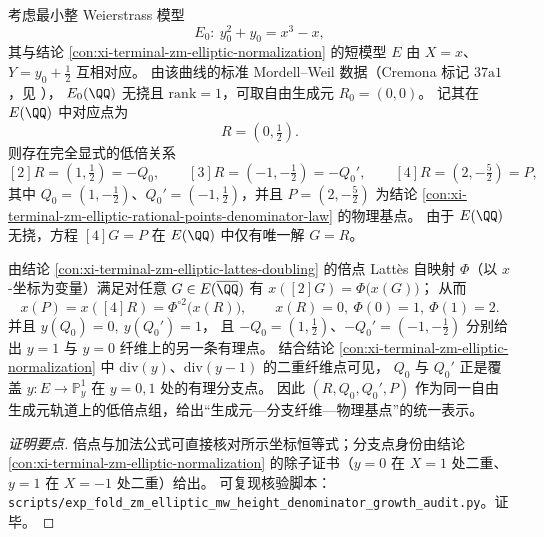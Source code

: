 
\begin{conclusion}\label{con:xi-terminal-zm-elliptic-mw-generator-alignment}
考虑最小整 Weierstrass 模型
\[
E_0:\ y_0^2+y_0=x^3-x,
\]
其与结论 \ref{con:xi-terminal-zm-elliptic-normalization} 的短模型 \(E\) 由 \(X=x\)、\(Y=y_0+\tfrac12\) 互相对应。
由该曲线的标准 Mordell--Weil 数据（Cremona 标记 \(37\mathrm{a}1\)，见 \cite{LMFDBEllipticCurve37a1}），
\(E_0(\QQ)\) 无挠且 \(\mathrm{rank}=1\)，可取自由生成元 \(R_0=(0,0)\)。
记其在 \(E(\QQ)\) 中对应点为
\[
R=(0,\tfrac12).
\]
则存在完全显式的低倍关系
\[
[2]R=\left(1,\tfrac12\right)=-Q_0,\qquad
[3]R=\left(-1,-\tfrac12\right)=-Q_0',\qquad
[4]R=\left(2,-\tfrac52\right)=P,
\]
其中 \(Q_0=(1,-\tfrac12)\)、\(Q_0'=(-1,\tfrac12)\)，并且 \(P=(2,-\tfrac52)\) 为结论 \ref{con:xi-terminal-zm-elliptic-rational-points-denominator-law} 的物理基点。
由于 \(E(\QQ)\) 无挠，方程 \([4]G=P\) 在 \(E(\QQ)\) 中仅有唯一解 \(G=R\)。
\par
由结论 \ref{con:xi-terminal-zm-elliptic-lattes-doubling} 的倍点 Latt\`es 自映射 \(\Phi\)（以 \(x\)-坐标为变量）满足对任意 \(G\in E(\overline{\QQ})\) 有
\(
x([2]G)=\Phi\bigl(x(G)\bigr)
\)；
从而
\[
x(P)=x([4]R)=\Phi^{\circ 2}\!\bigl(x(R)\bigr),
\qquad
x(R)=0,\ \Phi(0)=1,\ \Phi(1)=2.
\]
并且
\(
y(Q_0)=0,\ y(Q_0')=1
\)，
且 \(-Q_0=(1,\tfrac12)\)、\(-Q_0'=(-1,-\tfrac12)\) 分别给出 \(y=1\) 与 \(y=0\) 纤维上的另一条有理点。
结合结论 \ref{con:xi-terminal-zm-elliptic-normalization} 中 \(\mathrm{div}(y)\)、\(\mathrm{div}(y-1)\) 的二重纤维点可见，
\(Q_0\) 与 \(Q_0'\) 正是覆盖 \(y:E\to\mathbb P^1_y\) 在 \(y=0,1\) 处的有理分支点。
因此 \((R,Q_0,Q_0',P)\) 作为同一自由生成元轨道上的低倍点组，给出“生成元—分支纤维—物理基点”的统一表示。
\end{conclusion}
\begin{proof}[证明要点]
倍点与加法公式可直接核对所示坐标恒等式；分支点身份由结论 \ref{con:xi-terminal-zm-elliptic-normalization} 的除子证书（\(y=0\) 在 \(X=1\) 处二重、\(y=1\) 在 \(X=-1\) 处二重）给出。
可复现核验脚本：\texttt{scripts/exp\_fold\_zm\_elliptic\_mw\_height\_denominator\_growth\_audit.py}。证毕。
\end{proof}

